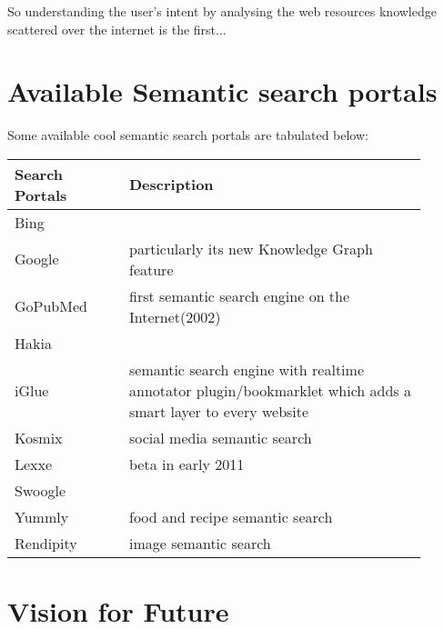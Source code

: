 \documentclass[12pt,a4]{article}
\begin{document}
So understanding the user's intent by analysing the web resources knowledge scattered over the internet is the first...


\section{Available Semantic search portals}
Some available cool semantic search portals are tabulated below:


\begin{tabular}{p{0.25\linewidth}|p{0.65\linewidth}}
  \hline
  Search Portals &Description \\
    \hline
    Bing\\
    Google& particularly its new Knowledge Graph feature\\
    GoPubMed&first semantic search engine on the Internet(2002)\\
    Hakia\\
    iGlue & semantic search engine with realtime annotator plugin/bookmarklet which adds a smart layer to every website\\
    Kosmix & social media semantic search\\
    Lexxe & beta in early 2011\\
    Swoogle\\
    Yummly& food and recipe semantic search\\
    Rendipity & image semantic search\\
    
    \hline
  \end{tabular}
  
  


\section{Vision for Future}
\end{document}
